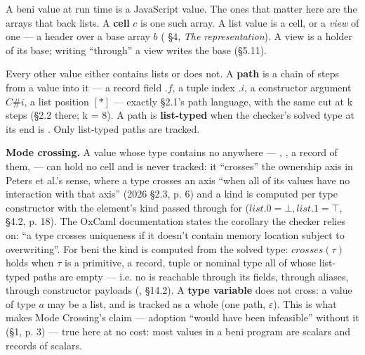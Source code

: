 

A beni value at run time is a JavaScript value. The ones that matter here are the arrays that back lists. A \textbf{cell} $c$ is one such array. A list value is a cell, or a \emph{view} of one — a header  over a base array $b$ ( §4, \emph{The representation}). A view is a holder of its base; writing “through” a view writes the base (§5.11).

Every other value either contains lists or does not. A \textbf{path} is a chain of steps from a value into it — a record field $.f$, a tuple index $.i$, a constructor argument $C\#i$, a list position $[\ast ]$ — exactly  §2.1's path language, with the same cut at k steps (§2.2 there; k = 8). A path is \textbf{list-typed} when the checker's solved type at its end is . Only list-typed paths are tracked.

\textbf{Mode crossing.} A value whose type contains no  anywhere — , , a record of them,  — can hold no cell and is never tracked: it “crosses” the ownership axis in Peters et al.'s sense, where a type crosses an axis “when all of its values have no interaction with that axis” (2026 §2.3, p. 6) and a kind is computed per type constructor with the element's kind passed through for  ($\mathit{list}.0=\bot ,\allowbreak{}\mathit{list}.1=\top$, §4.2, p. 18). The OxCaml documentation states the corollary the checker relies on: “a type crosses uniqueness if it doesn't contain memory location subject to overwriting”. For beni the kind is computed from the solved type: $\mathit{crosses}(\tau )$ holds when $\tau$ is a primitive, a record, tuple or nominal type all of whose list-typed paths are empty — i.e. no  is reachable through its fields, through aliases, through constructor payloads (,  §14.2). A \textbf{type variable} does not cross: a value of type $a$ may be a list, and is tracked as a whole (one path, $\varepsilon$). This is what makes Mode Crossing's claim — adoption “would have been infeasible” without it (§1, p. 3) — true here at no cost: most values in a beni program are scalars and records of scalars.

